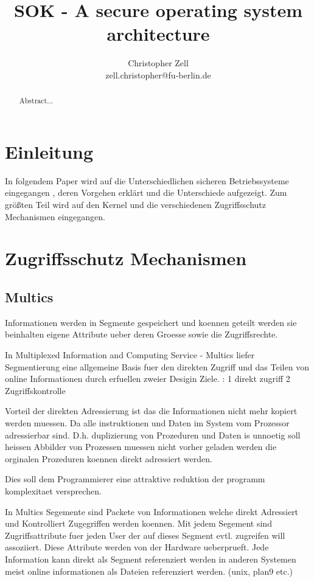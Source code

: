 \documentclass[9pt,technote]{IEEEtran}
\title{SOK - A secure operating system architecture}
\author{Christopher Zell\\
        zell.christopher@fu-berlin.de}
\begin{document}
\maketitle

  \begin{abstract}
    Abstract...
  \end{abstract}
  
  \section{Einleitung} \label{sec:intro}
    In folgendem Paper wird auf die Unterschiedlichen sicheren Betriebssysteme eingegangen ,
    deren Vorgehen erkl\"art und die Unterschiede aufgezeigt. Zum gr\"o\ss ten Teil
    wird auf den Kernel und die verschiedenen Zugriffsschutz Mechanismen eingegangen.
  \section{Zugriffsschutz Mechanismen} \label{sec:protection}
   \nocite{*}   
  
   \subsection{Multics}  
   
   Informationen werden in Segmente gespeichert und koennen geteilt werden sie beinhalten eigene Attribute 
   ueber deren Groesse sowie die Zugriffsrechte.
   
   In Multiplexed Information and Computing Service - Multics  liefer Segmentierung eine allgemeine Basis fuer den direkten Zugriff
   und das Teilen von online Informationen durch erfuellen zweier Desigin Ziele. : 1 direkt zugriff 2 Zugriffskontrolle
   
   Vorteil der direkten Adressierung ist das die Informationen nicht mehr kopiert werden muessen. Da alle instruktionen und Daten
   im System vom Prozessor adressierbar sind. D.h. duplizierung von Prozeduren und Daten is unnoetig soll heissen Abbilder von Prozessen muessen
   nicht vorher geladen werden die orginalen Prozeduren koennen direkt adressiert werden.
   
  Dies soll dem Programmierer eine attraktive reduktion der programm komplexitaet versprechen.
  
  In Multics Segemente sind Packete von Informationen welche direkt Adressiert und Kontrolliert Zugegriffen werden koennen.
  Mit jedem Segement sind Zugriffsattribute fuer jeden User der auf dieses Segment evtl. zugreifen will assoziiert.
  Diese Attribute werden von der Hardware ueberprueft. Jede Information kann direkt als Segment referenziert werden
  in anderen Systemen meist online informationen als Dateien referenziert werden. (unix, plan9 etc.)
  
\end{document}

